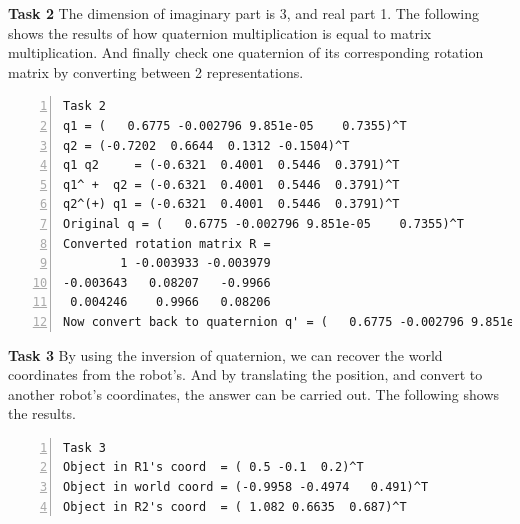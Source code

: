 \documentclass[12pt,a4paper]{article}
\begin{document}
    \textsf{\textbf{Task 2}}
    The dimension of imaginary part is 3, and real part 1.
    The following shows the results of 
    how quaternion multiplication is equal to matrix multiplication.
    And finally check one quaternion of its corresponding rotation matrix
    by converting between 2 representations.
    \begin{lstlisting}[frame=single,numbers=left]
Task 2
q1 = (   0.6775 -0.002796 9.851e-05    0.7355)^T
q2 = (-0.7202  0.6644  0.1312 -0.1504)^T
q1 q2     = (-0.6321  0.4001  0.5446  0.3791)^T
q1^ +  q2 = (-0.6321  0.4001  0.5446  0.3791)^T
q2^(+) q1 = (-0.6321  0.4001  0.5446  0.3791)^T
Original q = (   0.6775 -0.002796 9.851e-05    0.7355)^T
Converted rotation matrix R =
        1 -0.003933 -0.003979
-0.003643   0.08207   -0.9966
 0.004246    0.9966   0.08206
Now convert back to quaternion q' = (   0.6775 -0.002796 9.851e-05    0.7355)^T
    \end{lstlisting}

    \textsf{\textbf{Task 3}}
    By using the inversion of quaternion, 
    we can recover the world coordinates from the robot's.
    And by translating the position, and convert to another robot's
    coordinates, the answer can be carried out.
    The following shows the results.
    \begin{lstlisting}[frame=single,numbers=left]
Task 3
Object in R1's coord  = ( 0.5 -0.1  0.2)^T
Object in world coord = (-0.9958 -0.4974   0.491)^T
Object in R2's coord  = ( 1.082 0.6635  0.687)^T
    \end{lstlisting}

    
\end{document}
